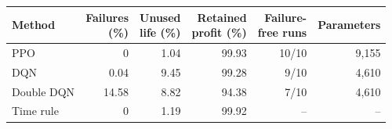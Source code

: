 {\footnotesize\setlength{\tabcolsep}{2.5pt}\renewcommand{\arraystretch}{1.08}%
\begin{tabular}{@{}lrrrrr@{}}
\toprule
Method & \shortstack{Failures\\(\%)} & \shortstack{Unused\\life (\%)} & \shortstack{Retained\\profit (\%)} & \shortstack{Failure-\\free runs} & Parameters\\
\midrule
PPO & 0 & 1.04 & 99.93 & 10/10 & 9,155\\
DQN & 0.04 & 9.45 & 99.28 & 9/10 & 4,610\\
Double DQN & 14.58 & 8.82 & 94.38 & 7/10 & 4,610\\
\midrule
Time rule & 0 & 1.19 & 99.92 & -- & --\\
\bottomrule
\end{tabular}}

